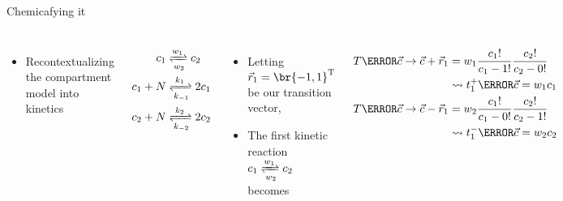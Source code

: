 \documentclass[aspectratio=169,  notheorems, sOuRcEs]{RUCPresentation}
\newcounter{reaction}
\begin{document}
\begin{frame}{Chemicafying it}


    \begin{columns}[T]
        \begin{itemize}
            \item Recontextualizing the compartment model into kinetics
        \end{itemize}
        \begin{align*}
            c_1 &\xrightleftharpoons[w_2]{w_1} c_2 \\
            c_1 + N &\xrightleftharpoons[k_{-1}]{k_1} 2c_1\\
            c_2 + N &\xrightleftharpoons[k_{-2}]{k_2} 2c_2
        \end{align*}

        \begin{itemize}
            \item Letting  \(\vec{r}_1 = \br{-1,1}^{\mathrm{T}} \) be our transition vector,
            \item The first kinetic reaction \(c_1 \xrightleftharpoons[w_2]{w_1} c_2 \)
            becomes
        \end{itemize}
        \begin{align*}
                T\of{ \vec{c} \to \vec{c} + \vec{r}_1} &= w_1 {c_1!\over {c_1 - 1}!}{c_2!\over {c_2 - 0}!} \\
            &\leadsto t_1^+\of{\vec{c}} = w_1 c_1 \\
                T\of{ \vec{c} \to \vec{c} - \vec{r}_1} &= w_2 {c_1!\over {c_1 - 0}!}{c_2!\over {c_2 - 1}!} \\
            &\leadsto t_1^-\of{\vec{c}} = w_2 c_2
        \end{align*}

    \end{columns}

\end{frame}
\end{document}
